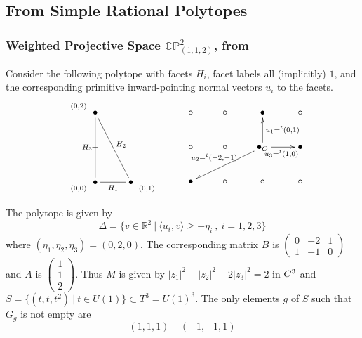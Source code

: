\documentclass{article}
\newcommand{\PP}{\mathbb{P}}
\newcommand{\RR}{\mathbb{R}}
\newcommand{\CC}{\mathbb{C}}
\begin{document}
	
	
	
	
	
	
	
	
	
	
	
	
	
	
	
	
	
	
	
	
	\subsection{From Simple Rational Polytopes}
	\subsubsection{Weighted Projective Space $\CC\PP^2_{(1,1,2)}$, from \cite{Holm2012}}
	Consider the following polytope with facets $H_i$, facet labels all (implicitly) $1$, and the corresponding primitive inward-pointing normal vectors $u_i$ to the facets.{\tiny
		\[
		\xymatrix{ 
			\ar@{}[r]^{(0,2)}&\bullet\ar@{-}[dd]_{H_3}\ar@{-}[rdd]^{H_2}&&\\
			&-&&\\
			\ar@{}[r]_{(0,0)}&\bullet\ar@{-}[r]_{H_1}&\bullet \ar@{}[r]_{(0,1)}&
		}
		\ \ \ \ \ \ 
		\xymatrix{
			\circ&\circ&\bullet&\circ\\
			\circ&\circ&\bullet_O\ar[u]_{u_1=^t(0,1) }\ar[r]_{u_3=^t(1,0) }\ar[dll]_{u_2=^t(-2,-1)}&\bullet\\
			\bullet&\circ&\circ&\circ
		}
		\]
	}
	
	
	The polytope is given by $$\Delta=\{v \in \RR^2 \ |\ \langle u_i, v \rangle \geq -\eta_i\ ,\ i=1,2,3 \}$$ where $(\eta_1,\eta_2,\eta_3)=(0,2,0)$. The corresponding matrix $B$ is {\small $\left(\begin{array}{ccc} 0&-2&1 \\ 1&-1&0 \end{array}\right)$} and $A$ is {\small $\left(\begin{array}{c} 1\\ 1\\2 \end{array}\right)$}. Thus $M$ is given by $|z_1|^2 + |z_2|^2 + 2|z_3|^2=2$ in $\\C^3$ and $S = \{(t,t,t^2) \ |\ t \in U(1)\} \subset T^{3} = U(1)^3$. The only elements $g$ of $S$ such that $G_g$ is not empty are
	\[
	(1,1,1) \ \ \ \ \ (-1,-1,1)
	\]
	
\end{document}
